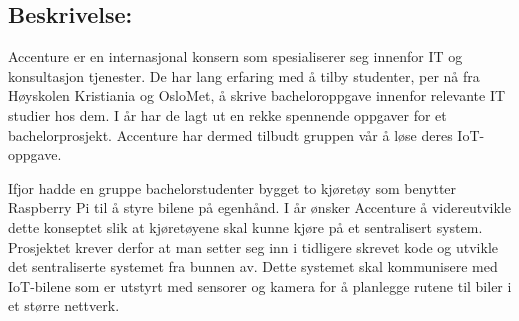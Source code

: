 \documentclass[11pt, a4paper, norsk]{report}
\begin{document}
\subsection*{Beskrivelse:}
Accenture er en internasjonal konsern som spesialiserer seg innenfor IT og konsultasjon tjenester. De har lang erfaring med å tilby studenter, per nå fra Høyskolen Kristiania og OsloMet, å skrive bacheloroppgave innenfor relevante IT studier hos dem. I år har de lagt ut en rekke spennende oppgaver for et bachelorprosjekt. Accenture har dermed tilbudt gruppen vår å løse deres IoT-oppgave.

Ifjor hadde en gruppe bachelorstudenter bygget to kjøretøy som benytter Raspberry Pi til å styre bilene på egenhånd. I år ønsker Accenture å videreutvikle dette konseptet slik at kjøretøyene skal kunne kjøre på et sentralisert system. Prosjektet krever derfor at man setter seg inn i tidligere skrevet kode og utvikle det sentraliserte systemet fra bunnen av. Dette systemet skal kommunisere med IoT-bilene som er utstyrt med sensorer og kamera for å planlegge rutene til biler i et større nettverk.
\end{document}
